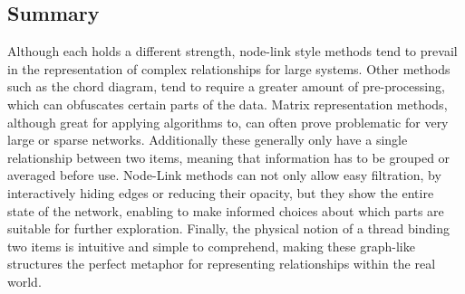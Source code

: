 \subsection{Summary}

Although each holds a different strength, node-link style methods tend to prevail in the representation of complex relationships for large systems. Other methods such as the chord diagram, tend to require a greater amount of pre-processing, which can obfuscates certain parts of the data. Matrix representation methods, although great for applying algorithms to, can often prove problematic for very large or sparse networks. Additionally these generally only have a single relationship between two items, meaning that information has to be grouped or averaged before use. Node-Link methods can not only allow easy filtration, by interactively hiding edges or reducing their opacity, but they show the entire state of the network, enabling to make informed choices about which parts are suitable for further exploration. Finally, the physical notion of a thread binding two items is intuitive and simple to comprehend, making these graph-like structures the perfect metaphor for representing relationships within the real world.
